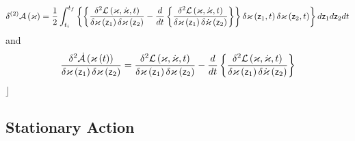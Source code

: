 \begin{equation}
\delta ^{\left( 2\right) }{\cal A}\left( \varkappa \right) =\frac{1}{2}%
\int_{t_{i}}^{t_{f}}\left\{ \left\{ \frac{\delta ^{2}{\cal L}\left( {\cal %
\varkappa },{\cal \dot{\varkappa}},t\right) }{\delta \varkappa \left( {\sf z}%
_{1}\right) \delta \varkappa \left( {\sf z}_{2}\right) }-\frac{d}{dt}\left\{ 
\frac{\delta ^{2}{\cal L}\left( \varkappa ,\dot{\varkappa},t\right) }{\delta
\varkappa \left( {\sf z}_{1}\right) \delta \dot{\varkappa}\left( {\sf z}%
_{2}\right) }\right\} \right\} \delta \varkappa \left( {\sf z}_{1},t\right)
\delta \varkappa \left( {\sf z}_{2},t\right) \right\} d{\sf z}_{1}d{\sf z}%
_{2}dt
\end{equation}%
and 
\begin{equation}
\frac{\delta ^{2}{\cal \dot{A}}\left( \varkappa \left( t\right) \right) }{%
\delta \varkappa \left( {\sf z}_{1}\right) \delta \varkappa \left( {\sf z}%
_{2}\right) }=\frac{\delta ^{2}{\cal L}\left( {\cal \varkappa },{\cal \dot{%
\varkappa}},t\right) }{\delta \varkappa \left( {\sf z}_{1}\right) \delta
\varkappa \left( {\sf z}_{2}\right) }-\frac{d}{dt}\left\{ \frac{\delta ^{2}%
{\cal L}\left( \varkappa ,\dot{\varkappa},t\right) }{\delta \varkappa \left( 
{\sf z}_{1}\right) \delta \dot{\varkappa}\left( {\sf z}_{2}\right) }\right\}
\end{equation}%
$\rfloor $

\subsection{Stationary Action}

